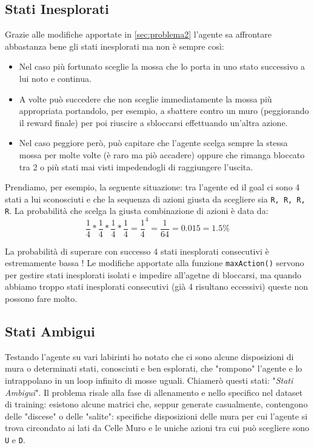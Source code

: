 \subsection{Stati Inesplorati}
Grazie alle modifiche apportate in \autoref{sec:problema2} l'agente sa affrontare abbastanza bene gli stati inesplorati ma non \`{e} sempre cos\`{i}:

\begin{itemize}
	\item Nel caso pi\`{u} fortunato sceglie la mossa che lo porta in uno stato successivo a lui noto e continua.
	\item A volte pu\`{o} succedere che non sceglie immediatamente la mossa pi\`{u} appropriata portandolo, per esempio, a sbattere contro un muro (peggiorando il  reward finale) per poi riuscire a sbloccarsi effettuando un'altra azione.
	\item Nel caso peggiore per\`{o}, pu\`{o} capitare che l'agente scelga sempre la stessa mossa per molte volte (\`{e} raro ma pi\`{o} accadere) oppure che rimanga bloccato tra 2 o pi\`{u} stati mai visti impedendogli di raggiungere l'uscita.
\end{itemize}

Prendiamo, per esempio, la seguente situazione: tra l'agente ed il goal ci sono 4 stati a lui sconosciuti e che la sequenza di azioni giusta da scegliere sia \lstinline[style=cmd]|R, R, R, R|. La probabilit\`{a} che scelga la giusta combinazione di azioni \`{e} data da:
\[\frac{1}{4} * \frac{1}{4} * \frac{1}{4} * \frac{1}{4} = {\frac{1}{4}}^4 = \frac{1}{64} = 0.015 = 1.5\%\]

La probabilit\`{a} di superare con successo 4 stati inesplorati consecutivi \`{e} estremamente bassa ! Le modifiche apportate alla funzione \lstinline[style=cmd]|maxAction()| servono per gestire stati inesplorati isolati e impedire all'agetne di bloccarsi, ma quando abbiamo troppo stati inesplorati consecutivi (gi\`{a} 4 risultano eccessivi)  queste non possono fare molto.

\subsection{Stati Ambigui}

Testando l'agente su vari labirinti ho notato che ci sono alcune disposizioni di mura o determinati stati, conosciuti e ben esplorati, che "rompono" l'agente e lo intrappolano in un loop infinito di mosse uguali. Chiamer\`{o} questi stati: "\textit{Stati Ambigui}". Il problema risale alla fase di allenamento e nello specifico nel dataset di training: esistono alcune matrici che, seppur generate casualmente, contengono delle "discese" o delle "salite": specifiche disposizioni delle mura per cui l'agente si trova circondato ai lati da Celle Muro e le uniche azioni tra cui pu\`{o} scegliere sono \lstinline[style=cmd]|U| e \lstinline[style=cmd]|D|. 


